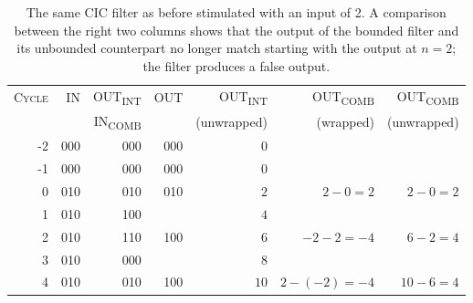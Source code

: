 \begin{table}
    \centering
    \caption[CIC Filter Example: Output Out of Range]{%
        The  same CIC  filter  as  before stimulated  with  an  input of  2. A
        comparison between the right two columns  shows that the output of the
        bounded filter and its unbounded  counterpart no longer match starting
        with the output at $n=2$; the filter produces a false output.%
    }
    \label{tab:cic_simu:cic_filter_states:out_of_bounds}
    \ttfamily
    \begin{tabular}{rrrrrrr}
        \toprule
        \scshape Cycle                   &
        \scshape IN                      &
        \scshape OUT\textsubscript{INT}  &
        \scshape OUT                     &
        \scshape OUT\textsubscript{INT}  &
        \scshape OUT\textsubscript{COMB} &
        \scshape OUT\textsubscript{COMB} \\

        &
        &
        \scshape IN\textsubscript{COMB} &
        &
        (unwrapped) &
        (wrapped)   &
        (unwrapped) \\

        \midrule
        -2 & 000 &  000 & 000 & $ 0$ &                        & \\
        -1 & 000 &  000 & 000 & $ 0$ &                        & \\
         0 & 010 &  010 & 010 & $ 2$ & $  2 -   0  =  2     $ & $ 2 - 0 = 2 $\\
         1 & 010 &  100 &     & $ 4$ &                        & \\
         2 & 010 &  110 & 100 & $ 6$ & $ -2 -   2  = -4     $ & $ 6 - 2 = 4 $\\
         3 & 010 &  000 &     & $ 8$ &                        & \\
         4 & 010 &  010 & 100 & $10$ & $  2 - (-2) = -4     $ & $10 - 6 = 4 $\\
        \bottomrule
    \end{tabular}
\end{table}
